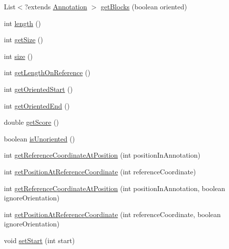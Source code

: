 \begin{DoxyCompactItemize}
\item 
List$<$?extends \hyperlink{interfaceumms_1_1core_1_1annotation_1_1_annotation}{Annotation} $>$ \hyperlink{interfaceumms_1_1core_1_1annotation_1_1_annotation_ae9c7679b26d2925a739b72f16bc0a422}{get\+Blocks} (boolean oriented)
\item 
int \hyperlink{interfaceumms_1_1core_1_1annotation_1_1_annotation_a5431a247302386cf5f607121fe256eb6}{length} ()
\item 
int \hyperlink{interfaceumms_1_1core_1_1annotation_1_1_annotation_a19aad320398985fa78572524f5dc4f88}{get\+Size} ()
\item 
int \hyperlink{interfaceumms_1_1core_1_1annotation_1_1_annotation_ab59b20bf3914e24babf0df6907bfb557}{size} ()
\item 
int \hyperlink{interfaceumms_1_1core_1_1annotation_1_1_annotation_a082064fbc61b16ca20c298473ed1b3cc}{get\+Length\+On\+Reference} ()
\item 
int \hyperlink{interfaceumms_1_1core_1_1annotation_1_1_annotation_ad11e657218df42bd003f432797e92f34}{get\+Oriented\+Start} ()
\item 
int \hyperlink{interfaceumms_1_1core_1_1annotation_1_1_annotation_a6c505cf912abeadd9d3647d0ee719ed2}{get\+Oriented\+End} ()
\item 
double \hyperlink{interfaceumms_1_1core_1_1annotation_1_1_annotation_a117f218fd9f4b0bbe5e183647c9d4826}{get\+Score} ()
\item 
boolean \hyperlink{interfaceumms_1_1core_1_1annotation_1_1_annotation_a796b34bf340d8ebe30937eb5b0b5d8d2}{is\+Unoriented} ()
\item 
int \hyperlink{interfaceumms_1_1core_1_1annotation_1_1_annotation_a71683725c96fca10f0134a088643ec36}{get\+Reference\+Coordinate\+At\+Position} (int position\+In\+Annotation)
\item 
int \hyperlink{interfaceumms_1_1core_1_1annotation_1_1_annotation_ad9091621cfc9cbcbdd479bb110977fde}{get\+Position\+At\+Reference\+Coordinate} (int reference\+Coordinate)
\item 
int \hyperlink{interfaceumms_1_1core_1_1annotation_1_1_annotation_a6be0c715300cbcb96f2e85d7b6e1680d}{get\+Reference\+Coordinate\+At\+Position} (int position\+In\+Annotation, boolean ignore\+Orientation)
\item 
int \hyperlink{interfaceumms_1_1core_1_1annotation_1_1_annotation_a68215c51102c8d67dcbd2152d7ea84ac}{get\+Position\+At\+Reference\+Coordinate} (int reference\+Coordinate, boolean ignore\+Orientation)
\item 
void \hyperlink{interfaceumms_1_1core_1_1annotation_1_1_annotation_ae077ebc7788964176739ff85bf29b560}{set\+Start} (int start)

\end{DoxyCompactItemize}
